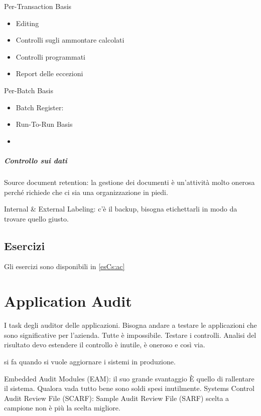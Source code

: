 Per-Transaction Basis 
\begin{itemize}
\item Editing
\item Controlli sugli ammontare calcolati
\item Controlli programmati
\item Report delle eccezioni
\end{itemize}

Per-Batch Basis

\begin{itemize}
\item Batch Register:
\item Run-To-Run Basis
\item
\end{itemize}

\paragraph{Controllo sui dati}


Source document retention: la gestione dei documenti è un'attività molto onerosa
perché richiede che ci sia una organizzazione in piedi.

Internal \& External Labeling: c'è il backup, bisogna etichettarli in modo da
trovare quello giusto.

\section{Esercizi}

Gli esercizi sono disponibili in \ref{esCs:ac}

\chapter{Application Audit}
\label{cs:aa}

I task degli auditor delle applicazioni. Bisogna andare a testare le
applicazioni che sono significative per l'azienda. Tutte è impossibile.
Testare i controlli. Analisi del risultato devo estendere il controllo è
inutile, è oneroso e così via.



si fa quando si vuole aggiornare i sistemi in produzione.

Embedded Audit Modules (EAM): il suo grande svantaggio È quello di rallentare il
sistema. Qualora vada tutto bene sono soldi spesi inutilmente.
Systems Control Audit Review File (SCARF):
Sample Audit Review File (SARF) scelta a campione non è più la scelta migliore.

